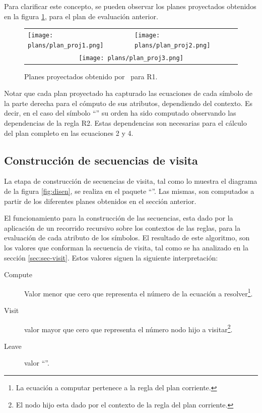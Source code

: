 Para clarificar este concepto, se pueden observar los planes proyectados obtenidos en la figura \ref{fig:plan_project}, para el plan de evaluación anterior.

\begin{figure}[!ht]\centering
\begin{tabular}{l l}
\texttt{[image: plans/plan\_proj1.png]} &
\texttt{[image: plans/plan\_proj2.png]}\\ 
\multicolumn{2}{c}{\texttt{[image: plans/plan\_proj3.png]}}\\
\end{tabular}
\caption{\label{fig:plan_project}Planes proyectados obtenido por \maggen\ para R1.}
\end{figure}

Notar que cada plan proyectado ha capturado las ecuaciones de cada símbolo de la parte derecha para el cómputo de sus atributos, dependiendo del contexto. Es decir, en el caso del símbolo ``'' su orden ha sido computado observando las dependencias de la regla R2. Estas dependencias son necesarias para el cálculo del plan completo en las ecuaciones 2 y 4. 

\subsection{Construcción de secuencias de visita}
\label{sec:constseqvisit}

La etapa de construcción de secuencias de visita, tal como lo muestra el diagrama de la figura \ref{fig:disen}, se realiza en el paquete ``''. Las mismas, son computados a partir de los diferentes planes obtenidos en el sección anterior.

El funcionamiento para la construcción de las secuencias, esta dado por la aplicación de un recorrido recursivo sobre los contextos de las reglas, para la evaluación de cada atributo de los símbolos. El resultado de este algoritmo, son los valores que conforman la secuencia de visita, tal como se ha analizado en la sección \ref{sec:sec-visit}. Estos valores siguen la siguiente interpretación: 

\begin{description}
\item [Compute] Valor menor que cero que representa el número de la ecuación a resolver\footnote{La ecuación a computar pertenece a la regla del plan corriente.}.
\item [Visit] valor mayor que cero que representa el número nodo hijo a visitar\footnote{El nodo hijo esta dado por el contexto de la regla del plan corriente.}.
\item [Leave] valor ``''.
\end{description}

